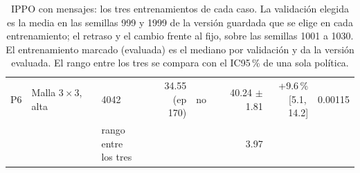\begin{table}[H]
\begin{tabular}{lllrlrrr}
P6 & \makecell[l]{Malla $3 \times 3$,\\{}alta} & 4042 & \makecell[r]{34.55\\{}(ep 170)} & no & \makecell[r]{40.24\\{}$\pm$ 1.81} & \makecell[r]{+9.6\,\%\\{}[5.1,\,14.2]} & 0.00115 \\
 & & \makecell[l]{rango entre\\{}los tres} & & & 3.97 & & \\
\bottomrule
\end{tabular}
\caption[Entrenamientos de IPPO con mensajes]{IPPO con mensajes: los tres entrenamientos de cada caso. La validación elegida es la media en las semillas 999 y 1999 de la versión guardada que se elige en cada entrenamiento; el retraso y el cambio frente al fijo, sobre las semillas 1001 a 1030. El entrenamiento marcado (evaluada) es el mediano por validación y da la versión evaluada. El rango entre los tres se compara con el IC95\,\% de una sola política.}
\label{tab:veredicto-bases-ippo-vecinos}
\end{table}

